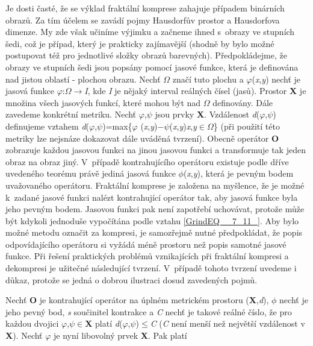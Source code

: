 \noindent Je dosti časté, že se výklad fraktální komprese zahajuje případem binárních obrazů. Za tím účelem se zavádí pojmy Hausdorfův prostor a Hausdorfova dimenze. My zde však učiníme výjimku a začneme ihned s~obrazy ve stupních šedi, což je případ, který je prakticky zajímavější (shodně by bylo možné postupovat též pro jednotlivé složky obrazů barevných). Předpokládejme, že obrazy ve stupních šedi jsou popsány pomocí jasové funkce, která je definována nad jistou oblastí - plochou obrazu. Nechť $\Omega$ značí tuto plochu a $\varphi$(\textit{x},\textit{y}) nechť je jasová funkce $\varphi$:$\Omega$$\rightarrow$\textit{I},  kde \textit{I} je nějaký interval reálných čísel (jasů). Prostor \textbf{X} je množina všech jasových funkcí, které mohou být nad $\Omega$ definovány. Dále zavedeme konkrétní metriku. Nechť $\varphi$,$\psi$ jsou prvky \textbf{X}. Vzdálenost \textit{d}($\varphi$,$\psi$) definujeme vztahem \textit{d}($\varphi$,$\psi$)=max\{\textbar $\varphi$ (\textit{x},\textit{y})$-$$\psi$(\textit{x},\textit{y})\textbar  \textbar  \textit{x},\textit{y}$\in$$\Omega$\} (při použití této metriky lze nejsnáze dokazovat dále uváděná tvrzení). Obecně operátor \textbf{O} zobrazuje každou jasovou funkci na jinou jasovou funkci a transformuje tak jeden obraz na obraz jiný. V~případě kontrahujícího operátoru existuje podle dříve uvedeného teorému právě jediná jasová funkce $\phi$(\textit{x},\textit{y}), která je pevným bodem uvažovaného operátoru. Fraktální komprese je založena na myšlence, že je možné k~zadané jasové funkci nalézt kontrahující operátor tak, aby jasová funkce byla jeho pevným bodem. Jasovou funkci pak není zapotřebí uchovávat, protože může být kdykoli jednoduše vypočítána podle vztahu \eqref{GrindEQ__7_11_}. Aby bylo možné metodu označit za kompresi, je samozřejmě nutné předpokládat, že popis odpovídajícího operátoru si vyžádá méně prostoru než popis samotné jasové funkce. Při řešení praktických problémů vznikajících při fraktální kompresi a dekompresi je užitečné následující tvrzení. V~případě tohoto tvrzení uvedeme i důkaz, protože se jedná o dobrou ilustraci dosud zavedených pojmů.

\noindent 

\noindent Nechť \textbf{O} je kontrahující operátor na úplném metrickém prostoru (\textbf{X},\textit{d}), $\phi$ nechť je jeho pevný bod, \textit{s} součinitel kontrakce a \textit{C} nechť je takové reálné číslo, že pro každou dvojici $\varphi$,$\psi$$\in$\textbf{X} platí \textit{d}($\varphi$,$\psi$)$\leq$\textit{C}  (\textit{C} není menší než největší vzdálenost v \textbf{X}). Nechť $\varphi$ je nyní libovolný prvek \textbf{X}. Pak platí

